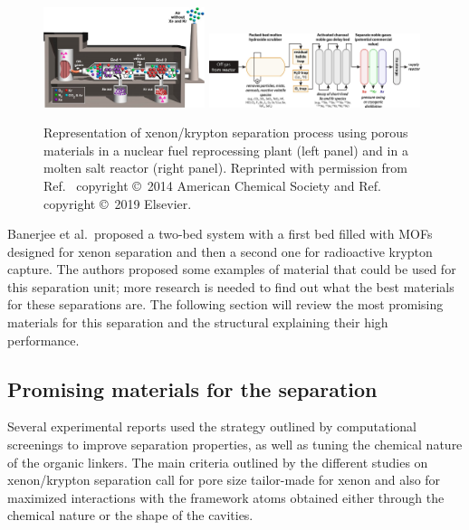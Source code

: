 \documentclass[main.tex]{subfiles}
\begin{document}
\begin{figure}[ht]
  \includegraphics[width=0.42\textwidth]{figures/1-screening/Kr_treatment.jpg}
  \hfill
  \includegraphics[width=0.55\textwidth]{figures/1-screening/MSR_noble_gas.jpg}
  \caption{Representation of xenon/krypton separation process using porous materials in a nuclear fuel reprocessing plant (left panel) and in a molten salt reactor (right panel). Reprinted with permission from Ref.~\cite{Banerjee_2014} copyright \copyright\ 2014 American Chemical Society and Ref.~\cite{Riley_2019} copyright \copyright\ 2019 Elsevier.}\label{fgr:industrial}
\end{figure}

Banerjee et al.\ proposed a two-bed system with a first bed filled with MOFs designed for xenon separation and then a second one for radioactive krypton capture.\autocite{Banerjee_2014} The authors proposed some examples of material that could be used for this separation unit; more research is needed to find out what the best materials for these separations are. The following section will review the most promising materials for this separation and the structural explaining their high performance. 


\subsection{Promising materials for the separation}

Several experimental reports used the strategy outlined by computational screenings to improve separation properties, as well as tuning the chemical nature of the organic linkers. The main criteria outlined by the different studies on xenon/krypton separation call for pore size tailor-made for xenon and also for maximized interactions with the framework atoms obtained either through the chemical nature or the shape of the cavities. 
\end{document}
